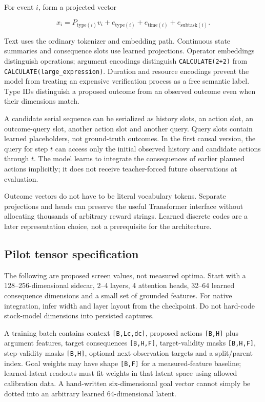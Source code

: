 \documentclass[
  11pt,
  a4paper,
]{article}
\begin{document}
For event \(i\), form a projected vector

\[
x_i=P_{\mathrm{type}(i)}v_i+e_{\mathrm{type}(i)}+e_{\mathrm{time}(i)}+e_{\mathrm{subtask}(i)}.
\]

Text uses the ordinary tokenizer and embedding path. Continuous state
summaries and consequence slots use learned projections. Operator
embeddings distinguish operations; argument encodings distinguish
\texttt{CALCULATE(2+2)} from \texttt{CALCULATE(large\_expression)}.
Duration and resource encodings prevent the model from treating an
expensive verification process as a free semantic label. Type IDs
distinguish a proposed outcome from an observed outcome even when their
dimensions match.

A candidate serial sequence can be serialized as history slots, an
action slot, an outcome-query slot, another action slot and another
query. Query slots contain learned placeholders, not ground-truth
outcomes. In the first causal version, the query for step \(t\) can
access only the initial observed history and candidate actions through
\(t\). The model learns to integrate the consequences of earlier planned
actions implicitly; it does not receive teacher-forced future
observations at evaluation.

Outcome vectors do not have to be literal vocabulary tokens. Separate
projections and heads can preserve the useful Transformer interface
without allocating thousands of arbitrary reward strings. Learned
discrete codes are a later representation choice, not a prerequisite for
the architecture.

\subsection{Pilot tensor
specification}\label{pilot-tensor-specification}

The following are proposed screen values, not measured optima. Start
with a 128--256-dimensional sidecar, 2--4 layers, 4 attention heads,
32--64 learned consequence dimensions and a small set of grounded
features. For native integration, infer width and layer layout from the
checkpoint. Do not hard-code stock-model dimensions into persisted
captures.

A training batch contains context \texttt{{[}B,Lc,dc{]}}, proposed
actions \texttt{{[}B,H{]}} plus argument features, target consequences
\texttt{{[}B,H,F{]}}, target-validity masks \texttt{{[}B,H,F{]}},
step-validity masks \texttt{{[}B,H{]}}, optional next-observation
targets and a split/parent index. Goal weights may have shape
\texttt{{[}B,F{]}} for a measured-feature baseline; learned-latent
readouts must fit weights in that latent space using allowed calibration
data. A hand-written six-dimensional goal vector cannot simply be dotted
into an arbitrary learned 64-dimensional latent.
\end{document}

